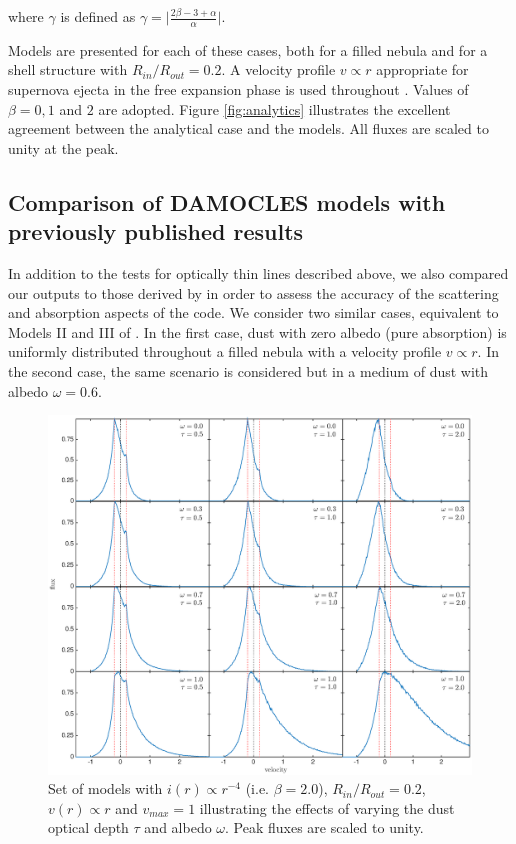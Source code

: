 \documentclass[useAMS,usenatbib,usegraphicx]{mnras}
\begin{document}
\noindent where $\gamma$ is defined as $\gamma= \lvert 
\frac{2\beta-3+\alpha}{\alpha} \rvert$.

Models are presented for each of these cases, both for a 
filled nebula and for a shell structure with $R_{in}/R_{out}=0.2$.  
A velocity profile $v \propto r$ appropriate for supernova ejecta in the free 
expansion phase is used throughout \citep{Li1992,Xu1992,McCray1996,Baron2005}.  Values of $\beta = 0, 1$ and $2$ are 
adopted.  Figure \ref{fig:analytics} illustrates the excellent agreement between 
the analytical case and the models.  All fluxes are scaled to unity at the peak.

\subsection{Comparison of DAMOCLES models with previously published results}
\label{opt_thick_testing}



In addition to the tests for optically thin lines described above, we also 
compared our outputs to those derived by \citet{Lucy1989} in order to 
assess the accuracy of the scattering and absorption aspects of the code.  
We consider two similar cases, equivalent to Models II and III of 
\citet{Lucy1989}. In the first case, dust with zero albedo (pure absorption) is 
uniformly distributed throughout a filled nebula with a velocity profile 
$v \propto r$.  In the second case, the same scenario is considered but in a 
medium of dust with albedo $\omega =0.6$.

\begin{figure}
\includegraphics[trim =80 10 40 15,clip=true,scale=0.515]{params/C/C_all} 
\caption{Set of models with $i(r) \propto r^{-4}$ (i.e. $\beta=2.0$), $R_{in}/R_{out}=0.2$, $v(r) \propto r$  
and $v_{max}=1$ illustrating the effects of varying the dust optical depth $\tau$ and albedo $\omega$. 
Peak fluxes are scaled to unity.}
\label{wt}
\end{figure}
\end{document}
